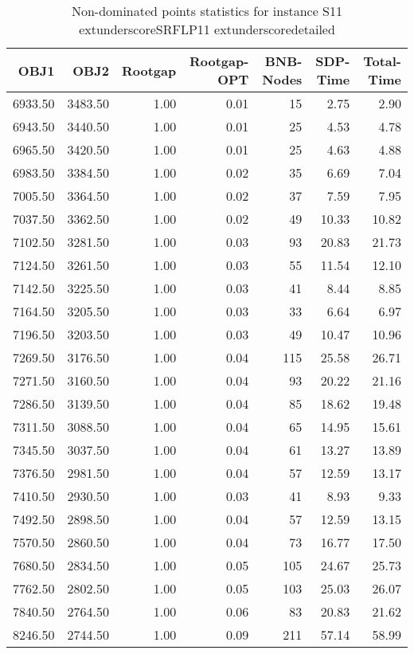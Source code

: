 \begin{table}
\caption{Non-dominated points statistics for instance S11	extunderscoreSRFLP11	extunderscoredetailed}
\label{tab:stats/S11_SRFLP11_detailed}
\begin{tabular}{rrrrrrr}
\toprule
OBJ1 & OBJ2 & Rootgap & Rootgap-OPT & BNB-Nodes & SDP-Time & Total-Time \\
\midrule
6933.50 & 3483.50 & 1.00 & 0.01 & 15 & 2.75 & 2.90 \\
6943.50 & 3440.50 & 1.00 & 0.01 & 25 & 4.53 & 4.78 \\
6965.50 & 3420.50 & 1.00 & 0.01 & 25 & 4.63 & 4.88 \\
6983.50 & 3384.50 & 1.00 & 0.02 & 35 & 6.69 & 7.04 \\
7005.50 & 3364.50 & 1.00 & 0.02 & 37 & 7.59 & 7.95 \\
7037.50 & 3362.50 & 1.00 & 0.02 & 49 & 10.33 & 10.82 \\
7102.50 & 3281.50 & 1.00 & 0.03 & 93 & 20.83 & 21.73 \\
7124.50 & 3261.50 & 1.00 & 0.03 & 55 & 11.54 & 12.10 \\
7142.50 & 3225.50 & 1.00 & 0.03 & 41 & 8.44 & 8.85 \\
7164.50 & 3205.50 & 1.00 & 0.03 & 33 & 6.64 & 6.97 \\
7196.50 & 3203.50 & 1.00 & 0.03 & 49 & 10.47 & 10.96 \\
7269.50 & 3176.50 & 1.00 & 0.04 & 115 & 25.58 & 26.71 \\
7271.50 & 3160.50 & 1.00 & 0.04 & 93 & 20.22 & 21.16 \\
7286.50 & 3139.50 & 1.00 & 0.04 & 85 & 18.62 & 19.48 \\
7311.50 & 3088.50 & 1.00 & 0.04 & 65 & 14.95 & 15.61 \\
7345.50 & 3037.50 & 1.00 & 0.04 & 61 & 13.27 & 13.89 \\
7376.50 & 2981.50 & 1.00 & 0.04 & 57 & 12.59 & 13.17 \\
7410.50 & 2930.50 & 1.00 & 0.03 & 41 & 8.93 & 9.33 \\
7492.50 & 2898.50 & 1.00 & 0.04 & 57 & 12.59 & 13.15 \\
7570.50 & 2860.50 & 1.00 & 0.04 & 73 & 16.77 & 17.50 \\
7680.50 & 2834.50 & 1.00 & 0.05 & 105 & 24.67 & 25.73 \\
7762.50 & 2802.50 & 1.00 & 0.05 & 103 & 25.03 & 26.07 \\
7840.50 & 2764.50 & 1.00 & 0.06 & 83 & 20.83 & 21.62 \\
8246.50 & 2744.50 & 1.00 & 0.09 & 211 & 57.14 & 58.99 \\

\end{tabular}
\end{table}
